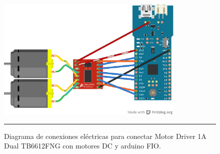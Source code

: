 \begin{figure}[htbp]
	\centering
		\includegraphics[width=0.8\textwidth]{./Figures/MODI/MODI_without_LED_bb.png}
		\rule{35em}{0.5pt}
	\caption[Conexión eléctrica Motor Driver 1A Dual TB6612FNG]{Diagrama de conexiones eléctricas para conectar Motor Driver 1A Dual TB6612FNG con motores DC y arduino FIO.}
	\label{fig:TB6612FNG}
\end{figure}


